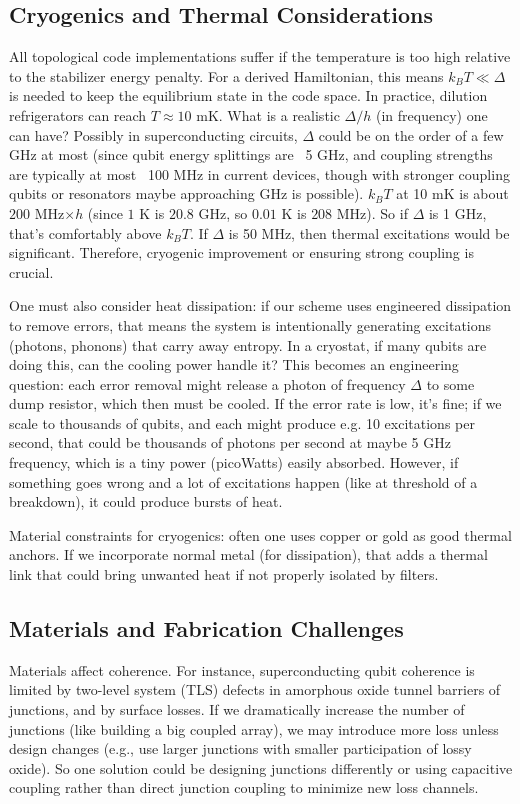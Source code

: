 \documentclass[11pt]{article}
\begin{document}
\subsection{Cryogenics and Thermal Considerations}
All topological code implementations suffer if the temperature is too high relative to the stabilizer energy penalty. For a derived Hamiltonian, this means $k_B T \ll \Delta$ is needed to keep the equilibrium state in the code space. In practice, dilution refrigerators can reach $T \approx 10$ mK. What is a realistic $\Delta/h$ (in frequency) one can have? Possibly in superconducting circuits, $\Delta$ could be on the order of a few GHz at most (since qubit energy splittings are ~5 GHz, and coupling strengths are typically at most ~100 MHz in current devices, though with stronger coupling qubits or resonators maybe approaching GHz is possible). $k_B T$ at 10 mK is about $200$ MHz$\times h$ (since $1$ K is $20.8$ GHz, so $0.01$ K is $208$ MHz). So if $\Delta$ is 1 GHz, that's comfortably above $k_B T$. If $\Delta$ is 50 MHz, then thermal excitations would be significant. Therefore, cryogenic improvement or ensuring strong coupling is crucial.

One must also consider heat dissipation: if our scheme uses engineered dissipation to remove errors, that means the system is intentionally generating excitations (photons, phonons) that carry away entropy. In a cryostat, if many qubits are doing this, can the cooling power handle it? This becomes an engineering question: each error removal might release a photon of frequency $\Delta$ to some dump resistor, which then must be cooled. If the error rate is low, it's fine; if we scale to thousands of qubits, and each might produce e.g. 10 excitations per second, that could be thousands of photons per second at maybe 5 GHz frequency, which is a tiny power (picoWatts) easily absorbed. However, if something goes wrong and a lot of excitations happen (like at threshold of a breakdown), it could produce bursts of heat.

Material constraints for cryogenics: often one uses copper or gold as good thermal anchors. If we incorporate normal metal (for dissipation), that adds a thermal link that could bring unwanted heat if not properly isolated by filters.

\subsection{Materials and Fabrication Challenges}
Materials affect coherence. For instance, superconducting qubit coherence is limited by two-level system (TLS) defects in amorphous oxide tunnel barriers of junctions, and by surface losses. If we dramatically increase the number of junctions (like building a big coupled array), we may introduce more loss unless design changes (e.g., use larger junctions with smaller participation of lossy oxide). So one solution could be designing junctions differently or using capacitive coupling rather than direct junction coupling to minimize new loss channels.
\end{document}
